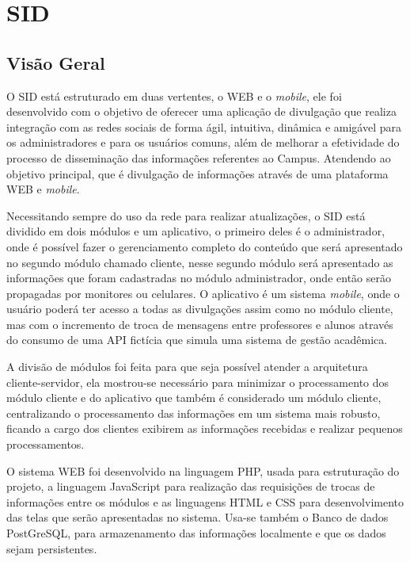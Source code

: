 \chapter[SID]{SID}
\label{cap:sid}

\section{Visão Geral} 
O SID está estruturado em duas vertentes, o WEB e o \textit{mobile}, ele foi desenvolvido com o objetivo de oferecer uma aplicação de divulgação que realiza integração com as redes sociais de forma ágil, intuitiva, dinâmica e amigável para os administradores e para os usuários comuns, além de melhorar a efetividade do processo de disseminação das informações referentes ao Campus. Atendendo ao objetivo principal, que é divulgação de informações através de uma plataforma WEB e \textit{mobile}.

Necessitando sempre do uso da rede para realizar atualizações, o SID está dividido em dois módulos e um aplicativo, o primeiro deles é o administrador, onde é possível fazer o gerenciamento completo do conteúdo que será apresentado no segundo módulo chamado cliente, nesse segundo módulo será apresentado as informações que foram cadastradas no módulo administrador, onde então serão propagadas por monitores ou celulares. O aplicativo é um sistema \textit{mobile}, onde o usuário poderá ter acesso a todas as divulgações assim como no módulo cliente, mas com o incremento de troca de mensagens entre professores e alunos através do consumo de uma API fictícia que simula uma sistema de gestão acadêmica. 

A divisão de módulos foi feita para que seja possível atender a arquitetura cliente-servidor, ela mostrou-se necessário para minimizar o processamento dos módulo cliente e do aplicativo que também é considerado um módulo cliente, centralizando o processamento das informações em um sistema mais robusto, ficando a cargo dos clientes exibirem as informações recebidas e realizar pequenos processamentos.

O sistema WEB foi desenvolvido na linguagem PHP, usada para estruturação do projeto, a linguagem JavaScript para realização das requisições de trocas de informações entre os módulos e as linguagens HTML e CSS para desenvolvimento das telas que serão apresentadas no sistema. Usa-se também o Banco de dados PostGreSQL, para armazenamento das informações localmente e que os dados sejam persistentes.

